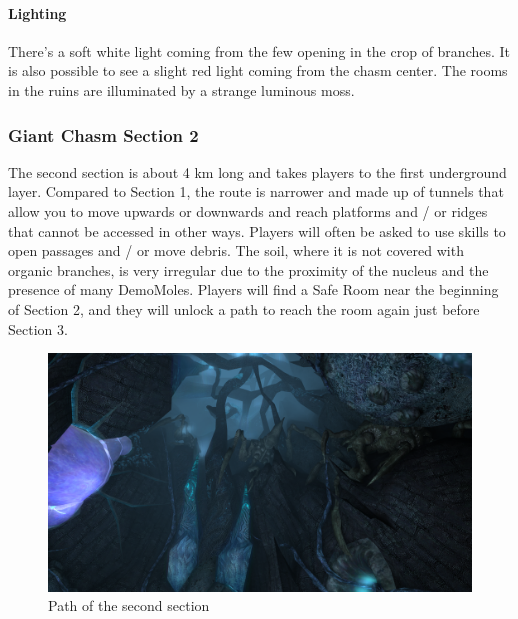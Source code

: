 \paragraph{Lighting}
There's a soft white light coming from the few opening in the crop of branches. It is also possible to see a slight red light coming from the chasm center. The rooms in the ruins are illuminated by a strange luminous moss.




\newpage
\subsubsection{Giant Chasm Section 2}
The second section is about 4 km long and takes players to the first underground layer.
Compared to Section 1, the route is narrower and made up of tunnels that allow you to move upwards or downwards and reach platforms and / or ridges that cannot be accessed in other ways. Players will often be asked to use skills to open passages and / or move debris. The soil, where it is not covered with organic branches, is very irregular due to the proximity of the nucleus and the presence of many DemoMoles. Players will find a Safe Room near the beginning of Section 2, and they will unlock a path to reach the room again just before Section 3.

\vspace*{0.3cm}
\begin{figure}[H]
	\centering
	\includegraphics[width=0.8\linewidth]{images/visual_ref/15_giant_chasm/chasm_section_2.png}
	\caption*{Path of the second section}
\end{figure}

